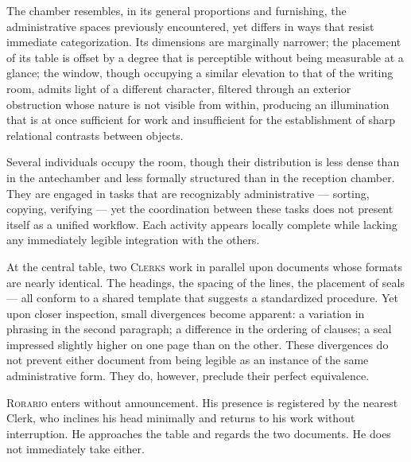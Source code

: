 \documentclass[12pt, oneside]{article}
\newenvironment{action}{%
  \vspace{0.6em}%
  \noindent\ignorespaces%
}{%
  \par\vspace{0.6em}%
}
\begin{document}
\begin{action}
The chamber resembles, in its general proportions and furnishing, the administrative spaces previously encountered, yet differs in ways that resist immediate categorization. Its dimensions are marginally narrower; the placement of its table is offset by a degree that is perceptible without being measurable at a glance; the window, though occupying a similar elevation to that of the writing room, admits light of a different character, filtered through an exterior obstruction whose nature is not visible from within, producing an illumination that is at once sufficient for work and insufficient for the establishment of sharp relational contrasts between objects.

Several individuals occupy the room, though their distribution is less dense than in the antechamber and less formally structured than in the reception chamber. They are engaged in tasks that are recognizably administrative --- sorting, copying, verifying --- yet the coordination between these tasks does not present itself as a unified workflow. Each activity appears locally complete while lacking any immediately legible integration with the others.
\end{action}

\begin{action}
At the central table, two \textsc{Clerks} work in parallel upon documents whose formats are nearly identical. The headings, the spacing of the lines, the placement of seals --- all conform to a shared template that suggests a standardized procedure. Yet upon closer inspection, small divergences become apparent: a variation in phrasing in the second paragraph; a difference in the ordering of clauses; a seal impressed slightly higher on one page than on the other. These divergences do not prevent either document from being legible as an instance of the same administrative form. They do, however, preclude their perfect equivalence.

\textsc{Rorario} enters without announcement. His presence is registered by the nearest Clerk, who inclines his head minimally and returns to his work without interruption. He approaches the table and regards the two documents. He does not immediately take either.
\end{action}
\end{document}

